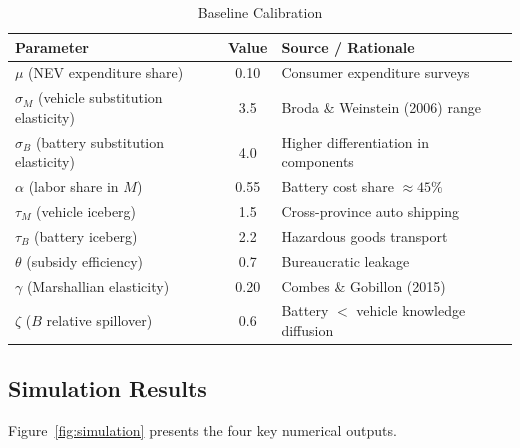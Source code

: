 \documentclass[11pt,a4paper]{article}
\newcommand{\sM}{\sigma_M}
\newcommand{\sB}{\sigma_B}
\newcommand{\tM}{\tau_M}
\newcommand{\tB}{\tau_B}
\newcommand{\tht}{\theta}
\begin{document}
\begin{table}[H]
\centering
\caption{Baseline Calibration}
\label{tab:calibration}
\begin{tabular}{l c l}
\toprule
\textbf{Parameter} & \textbf{Value} & \textbf{Source / Rationale} \\
\midrule
$\mu$ (NEV expenditure share) & 0.10 & Consumer expenditure surveys \\
$\sM$ (vehicle substitution elasticity) & 3.5 & Broda \& Weinstein (2006) range \\
$\sB$ (battery substitution elasticity) & 4.0 & Higher differentiation in components \\
$\alpha$ (labor share in $M$) & 0.55 & Battery cost share $\approx 45\%$ \\
$\tM$ (vehicle iceberg) & 1.5 & Cross-province auto shipping \\
$\tB$ (battery iceberg) & 2.2 & Hazardous goods transport \\
$\tht$ (subsidy efficiency) & 0.7 & Bureaucratic leakage \\
$\gamma$ (Marshallian elasticity) & 0.20 & Combes \& Gobillon (2015) \\
$\zeta$ ($B$ relative spillover) & 0.6 & Battery $<$ vehicle knowledge diffusion \\
\bottomrule
\end{tabular}
\end{table}

\subsection{Simulation Results}

Figure~\ref{fig:simulation} presents the four key numerical outputs.
\end{document}
